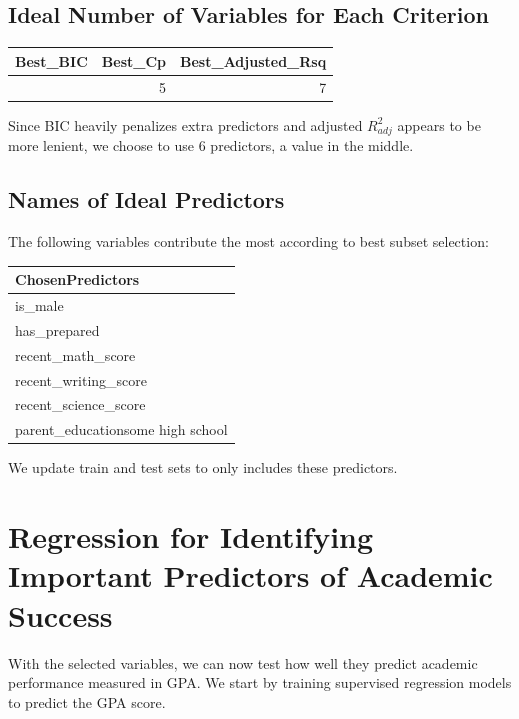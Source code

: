 \documentclass[
]{article}
\begin{document}
\subsection{Ideal Number of Variables for Each
Criterion}\label{ideal-number-of-variables-for-each-criterion}

\begin{longtable}[]{@{}rrr@{}}
\toprule\noalign{}
Best\_BIC & Best\_Cp & Best\_Adjusted\_Rsq \\
\midrule\noalign{}
\endhead
\bottomrule\noalign{}
\endlastfoot
4 & 5 & 7 \\
\end{longtable}

Since BIC heavily penalizes extra predictors and adjusted \(R^2_{adj}\)
appears to be more lenient, we choose to use 6 predictors, a value in
the middle.

\subsection{Names of Ideal Predictors}\label{names-of-ideal-predictors}

The following variables contribute the most according to best subset
selection:

\begin{longtable}[]{@{}l@{}}
\toprule\noalign{}
ChosenPredictors \\
\midrule\noalign{}
\endhead
\bottomrule\noalign{}
\endlastfoot
is\_male \\
has\_prepared \\
recent\_math\_score \\
recent\_writing\_score \\
recent\_science\_score \\
parent\_educationsome high school \\
\end{longtable}

We update train and test sets to only includes these predictors.

\section{Regression for Identifying Important Predictors of Academic
Success}\label{regression-for-identifying-important-predictors-of-academic-success}

With the selected variables, we can now test how well they predict
academic performance measured in GPA. We start by training supervised
regression models to predict the GPA score.
\end{document}
